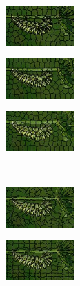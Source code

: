 \begin{figure}
	\begin{subfigure}[b]{0.02\textwidth}
	\end{subfigure}
	\begin{subfigure}[b]{0.141\textwidth}
		\includegraphics[height=1.525cm]{pictures/compactness/bsds500/ccs/score/25/cropped/ccs_35028_contours}
	\end{subfigure}
	\begin{subfigure}[b]{0.141\textwidth}
		\includegraphics[height=1.525cm]{pictures/compactness/bsds500/ccs/score/100/cropped/ccs_35028_contours}
	\end{subfigure}
	\begin{subfigure}[b]{0.141\textwidth}
		\includegraphics[height=1.525cm]{pictures/compactness/bsds500/ccs/score/500/cropped/ccs_35028_contours}
	\end{subfigure}\\
	\begin{subfigure}[b]{0.02\textwidth}
	\end{subfigure}
	\begin{subfigure}[b]{0.141\textwidth}
		\includegraphics[height=1.525cm]{pictures/compactness/bsds500/cw/score/0.01/cropped/cw_35028_contours}
	\end{subfigure}
	\begin{subfigure}[b]{0.141\textwidth}
		\includegraphics[height=1.525cm]{pictures/compactness/bsds500/cw/score/0.1/cropped/cw_35028_contours}

\end{subfigure}
\end{figure}
